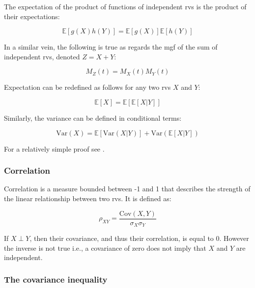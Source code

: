 \documentclass{report}
\begin{document}
The expectation of the product of functions of independent \glspl{rv} is the product of their expectations:

\begin{equation}\label{eq:independent-expectation}
    \mathbb{E}[g(X)h(Y)] = \mathbb{E}[g(X)]\mathbb{E}[h(Y)]
\end{equation}

In a similar vein, the following is true as regards the \gls{mgf} of the sum of independent \glspl{rv}, denoted $Z = X + Y$:

\begin{equation}\label{eq:mgf-of-sum-of-independent-rvs}
    M_Z(t) = M_X(t)M_Y(t)
\end{equation}

Expectation can be redefined as follows for any two \glspl{rv} $X$ and $Y$:

\begin{equation}\label{eq:conditional-expectation}
    \mathbb{E}[X] = \mathbb{E}\left[\mathbb{E}[X|Y]\right]
\end{equation}

Similarly, the variance can be defined in conditional terms:

\begin{equation}\label{eq:conditional-variance-2}
    \text{Var}(X) = \mathbb{E}\left[\text{Var}(X|Y)\right] + \text{Var}\left(\mathbb{E}[X|Y]\right)
\end{equation}

For a relatively simple proof see \cite[Chapter~4.4]{casella_statistical_2002}. 

\subsubsection{Correlation}

Correlation is a measure bounded between -1 and 1 that describes the strength of the linear relationship between two \glspl{rv}. It is defined as:

\begin{equation}\label{eq:correlation}
    \rho_{XY} = \frac{\text{Cov}(X, Y)}{\sigma_X\sigma_Y}
\end{equation}

If $X \perp Y$, then their covariance, and thus their correlation, is equal to 0. However the inverse is not true i.e., a covariance of zero does not imply that $X$ and $Y$ are independent.  

\subsubsection{The covariance inequality}
\end{document}
